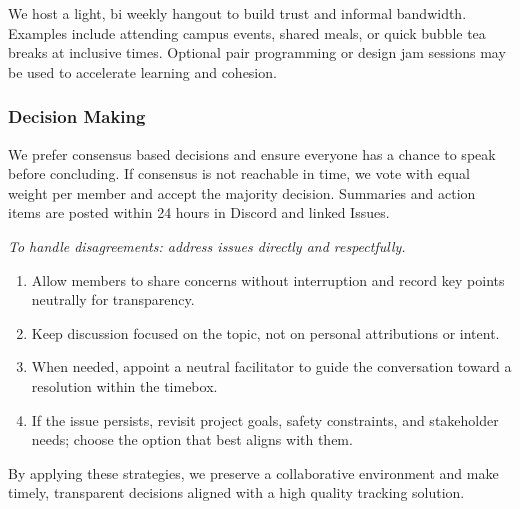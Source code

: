 \documentclass{article}
\begin{document}
We host a light, bi weekly hangout to build trust and informal bandwidth.
Examples include attending campus events, shared meals, or quick bubble tea
breaks at inclusive times. Optional pair programming or design jam sessions
may be used to accelerate learning and cohesion.

\subsubsection*{\color{blue}Decision Making}

We prefer consensus based decisions and ensure everyone has a chance to speak
before concluding. If consensus is not reachable in time, we vote with equal
weight per member and accept the majority decision. Summaries and action items
are posted within 24 hours in Discord and linked Issues.

\vspace{10pt}
\textit{To handle disagreements: address issues directly and respectfully.}

\begin{enumerate}
  \item Allow members to share concerns without interruption and record key
    points neutrally for transparency.
  \item Keep discussion focused on the topic, not on personal attributions or
    intent.
  \item When needed, appoint a neutral facilitator to guide the conversation
    toward a resolution within the timebox.
  \item If the issue persists, revisit project goals, safety constraints, and
    stakeholder needs; choose the option that best aligns with them.
\end{enumerate}

By applying these strategies, we preserve a collaborative environment and make
timely, transparent decisions aligned with a high quality tracking solution.
\end{document}
